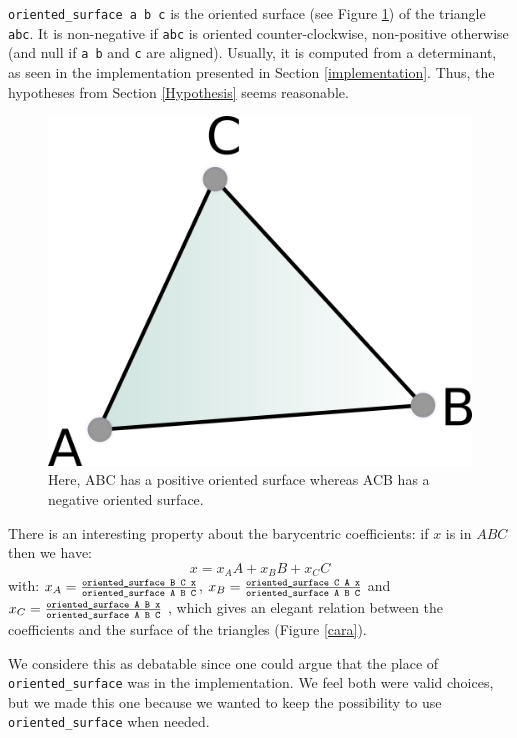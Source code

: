 \documentclass[a4paper,10pt]{article}
\begin{document}
{\tt oriented\_surface a b c} is the oriented surface (see Figure \ref{surface}) of the triangle {\tt abc}. It is non-negative if {\tt abc} is oriented counter-clockwise, non-positive otherwise (and null if {\tt a b} and {\tt c} are aligned).
Usually, it is computed from a determinant, as seen in the implementation presented in Section \ref{implementation}. Thus, the hypotheses from Section \ref{Hypothesis} seems reasonable.

\begin{figure}
  \centering
  \includegraphics{Surface}
  \caption{\label{surface} Here, ABC has a positive oriented surface whereas ACB has a negative oriented surface.}
\end{figure}

 There is an interesting property about the barycentric coefficients: if $x$ is in $ABC$ then we have:
$$x = x_AA + x_BB + x_CC$$
with: $x_A =\frac{ \text{\tt oriented\_surface B C x}}{\text{\tt oriented\_surface A B C}}$,
$x_B =\frac{ \text{\tt oriented\_surface C A x}}{\text{\tt oriented\_surface A B C}}$ and
$x_C =\frac{ \text{\tt oriented\_surface A B x}}{\text{\tt oriented\_surface A B C}}$
, which gives an elegant relation between the coefficients and the surface of the triangles (Figure \ref{cara}).

We considere this as debatable since one could argue that the place of {\tt oriented\_surface} was in the implementation. We feel both were valid choices, but we made this one because we wanted to keep the possibility to use {\tt oriented\_surface} when needed.
\end{document}
